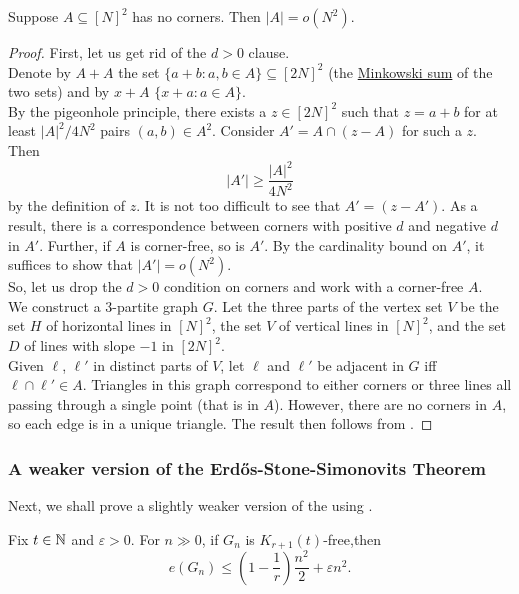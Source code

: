 			\begin{ftheo}
				\label{no corners theorem}
				Suppose $A\subseteq[N]^2$ has no corners. Then $|A| = o(N^2)$.
			\end{ftheo}
			\begin{proof}
				First, let us get rid of the $d>0$ clause.\\
				Denote by $A+A$ the set $\{a+b : a,b\in A\} \subseteq [2N]^2$ (the \href{https://en.wikipedia.org/wiki/Minkowski_addition}{Minkowski sum} of the two sets) and by $x+A$ $\{x+a : a\in A\}$.\\
				By the pigeonhole principle, there exists a $z\in[2N]^2$ such that $z=a+b$ for at least $|A|^2/4N^2$ pairs $(a,b)\in A^2$. Consider $A' = A \cap (z-A)$ for such a $z$. Then
				\[ |A'| \ge \frac{|A|^2}{4N^2} \]
				by the definition of $z$. It is not too difficult to see that $A' = (z - A')$. As a result, there is a correspondence between corners with positive $d$ and negative $d$ in $A'$. Further, if $A$ is corner-free, so is $A'$. By the cardinality bound on $A'$, it suffices to show that $|A'|=o(N^2)$.\\
				So, let us drop the $d > 0$ condition on corners and work with a corner-free $A$.\\

				We construct a $3$-partite graph $G$. Let the three parts of the vertex set $V$ be the set $H$ of horizontal lines in $[N]^2$, the set $V$ of vertical lines in $[N]^2$, and the set $D$ of lines with slope $-1$ in $[2N]^2$.\\
				Given $\ell$, $\ell'$ in distinct parts of $V$, let $\ell$ and $\ell'$ be adjacent in $G$ iff $\ell\cap\ell'\in A$. Triangles in this graph correspond to either corners or three lines all passing through a single point (that is in $A$). However, there are no corners in $A$, so each edge is in a unique triangle. The result then follows from .
			\end{proof}


		\subsubsection{A weaker version of the Erd\H{o}s-Stone-Simonovits Theorem}

			Next, we shall prove a slightly weaker version of the  using .

			\begin{ftheo}
				Fix $t\in\mathbb{N}$ and $\varepsilon>0$. For $n\gg 0$, if $G_n$ is $K_{r+1}(t)$-free,\footnotemark  then
				\[ e(G_n) \le \left( 1 - \frac{1}{r} \right) \frac{n^2}{2} + \varepsilon n^2. \]
			\end{ftheo}

